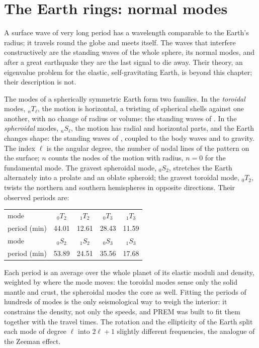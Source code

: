 \section{The Earth rings: normal modes}

A surface wave of very long period has a wavelength comparable to the Earth's
radius; it travels round the globe and meets itself. The waves that
interfere constructively are the standing waves of the whole sphere, its normal
modes, and after a great earthquake they are the last signal to die away.
Their theory, an eigenvalue problem for the elastic, self-gravitating Earth, is
beyond this chapter; their description is not.

The modes of a spherically symmetric Earth form two families. In the
\emph{toroidal} modes, ${}_nT_\ell$, the motion is horizontal, a twisting of
spherical shells against one another, with no change of radius or volume: the
standing waves of . In the \emph{spheroidal} modes, ${}_nS_\ell$,
the motion has radial and horizontal parts, and the Earth changes shape: the
standing waves of , coupled to the body waves and to gravity.
The index $\ell$ is the angular degree, the number of nodal lines of the
pattern on the surface; $n$ counts the nodes of the motion with radius, $n = 0$
for the fundamental mode. The gravest spheroidal mode, ${}_0S_2$, stretches the
Earth alternately into a prolate and an oblate spheroid; the gravest toroidal
mode, ${}_0T_2$, twists the northern and southern hemispheres in opposite
directions. Their observed periods are:
\begin{center}
\small
\begin{tabular}{lcccc}
\hline
mode & ${}_0T_2$ & ${}_1T_2$ & ${}_0T_3$ & ${}_1T_3$ \\
period (\unit{min}) & 44.01 & 12.61 & 28.43 & 11.59 \\
\hline
mode & ${}_0S_2$ & ${}_1S_2$ & ${}_0S_3$ & ${}_1S_3$ \\
period (\unit{min}) & 53.89 & 24.51 & 35.56 & 17.68 \\
\hline
\end{tabular}
\end{center}
Each period is an average over the whole planet of its elastic moduli and
density, weighted by where the mode moves: the toroidal modes sense only the
solid mantle and crust, the spheroidal modes the core as well. Fitting the
periods of hundreds of modes is the only seismological way to weigh the
interior: it constrains the density, not only the speeds, and PREM was built to
fit them together with the travel times. The rotation and the ellipticity of
the Earth split each mode of degree $\ell$ into $2\ell + 1$ slightly different
frequencies, the analogue of the Zeeman effect.

